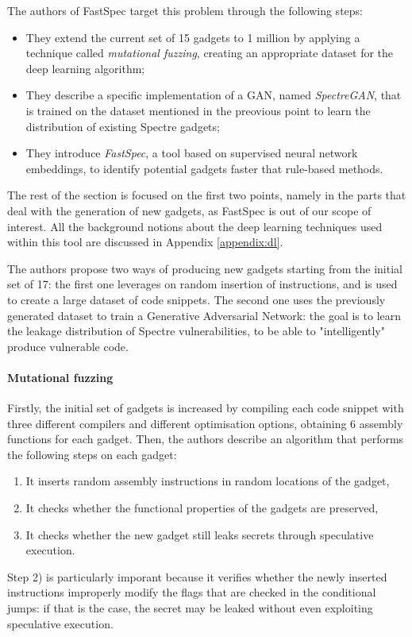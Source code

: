 \documentclass[12pt,a4paper]{book}
\theoremstyle{definition}
\begin{document}
	The authors of FastSpec target this problem through the following steps:
	\begin{itemize}
		\item They extend the current set of 15 gadgets to 1 million by applying a technique called \textit{mutational fuzzing}, creating an appropriate dataset for the deep learning algorithm;
		\item They describe a specific implementation of a GAN, named \textit{SpectreGAN}, that is trained on the dataset mentioned in the preovious point to learn the distribution of existing Spectre gadgets;
		\item They introduce \textit{FastSpec}, a tool based on supervised neural network embeddings, to identify potential gadgets faster that rule-based methods.
	\end{itemize}
	The rest of the section is focused on the first two points, namely in the parts that deal with the generation of new gadgets, as FastSpec is out of our scope of interest. All the background notions about the deep learning techniques used within this tool are discussed in Appendix \ref{appendix:dl}.

	The authors propose two ways of producing new gadgets starting from the initial set of 17: the first one leverages on random insertion of instructions, and is used to create a large dataset of code snippets. The second one uses the previously generated dataset to train a Generative Adversarial Network: the goal is to learn the leakage distribution of Spectre vulnerabilities, to be able to "intelligently" produce vulnerable code.
	\paragraph{Mutational fuzzing}
	Firstly, the initial set of gadgets is increased by compiling each code snippet with three different compilers and different optimisation options, obtaining 6 assembly functions for each gadget. Then, the authors describe an algorithm that performs the following steps on each gadget:
	\begin{enumerate}
		\item It inserts random assembly instructions in random locations of the gadget,
		\item It checks whether the functional properties of the gadgets are preserved,
		\item It checks whether the new gadget still leaks secrets through speculative execution.
	\end{enumerate}
	Step 2) is particularly imporant because it verifies whether the newly inserted instructions improperly modify the flags that are checked in the conditional jumps: if that is the case, the secret may be leaked without even exploiting speculative execution.
\end{document}
